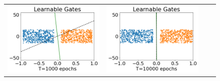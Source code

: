 \begin{figure}[h]
\begin{minipage}{1\columnwidth}
{\begin{tabular}{cccc}
\includegraphics[scale=0.2]{figs/learn-1e3-ae100.png}
&
\includegraphics[scale=0.2]{figs/learn-1e4-ae100.png}
\end{tabular}
}
\end{minipage}
\caption{}%
\label{fig:feat}
\end{figure}

